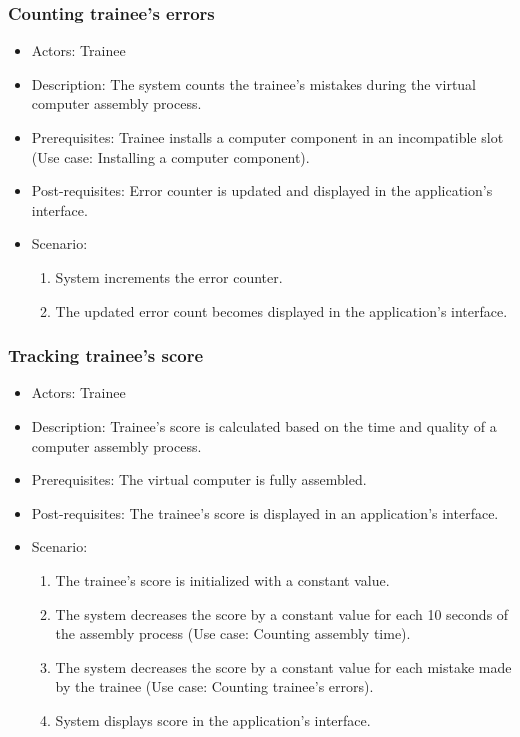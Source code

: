 \subsubsection{Counting trainee's errors}
\begin{itemize}
\item Actors: Trainee
\item Description: The system counts the trainee's mistakes during the virtual computer assembly process.
\item Prerequisites: Trainee installs a computer component in an incompatible slot (Use case: Installing a computer component). 
\item Post-requisites: Error counter is updated and displayed in the application's interface.
\item Scenario: 
\begin{enumerate}
    \item System increments the error counter.
    \item The updated error count becomes displayed in the application's interface.
\end{enumerate}

\end{itemize}

\subsubsection{Tracking trainee's score}
\begin{itemize}
\item Actors: Trainee
\item Description: Trainee's score is calculated based on the time and quality of a computer assembly process.
\item Prerequisites: The virtual computer is fully assembled.
\item Post-requisites: The trainee's score is displayed in an application's interface.
\item Scenario: 
\begin{enumerate}
    \item The trainee's score is initialized with a constant value.
    \item The system decreases the score by a constant value for each 10 seconds of the assembly process (Use case: Counting assembly time).
    \item The system decreases the score by a constant value for each mistake made by the trainee (Use case: Counting trainee's errors).
    \item System displays score in the application's interface.
\end{enumerate}

\end{itemize}
